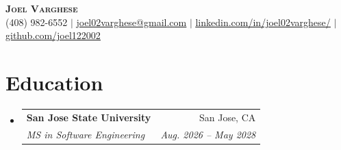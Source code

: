 \documentclass[letterpaper,11pt]{article}
\makeatletter
\newcommand{\resumeSubheading}[4]{
  \vspace{-2pt}\item
    \begin{tabular*}{0.97\textwidth}[t]{l@{\extracolsep{\fill}}r}
      \textbf{#1} & #2 \\
      \textit{\small#3} & \textit{\small #4} \\
    \end{tabular*}\vspace{-7pt}
}
\newcommand{\resumeSubHeadingListStart}{\begin{itemize}[leftmargin=0.15in, label={}]}
\newcommand{\resumeSubHeadingListEnd}{\end{itemize}}
\makeatother
\begin{document}
\begin{center}
  \textbf{\Huge \scshape Joel Varghese} \\ \vspace{1pt}
  \small (408) 982-6552 $|$ \href{mailto:joel02varghese@gmail.com}{\underline{joel02varghese@gmail.com}} $|$
  \href{https://www.linkedin.com/in/joel02varghese/}{\underline{linkedin.com/in/joel02varghese/}} $|$
  \href{https://github.com/joel122002}{\underline{github.com/joel122002}}
\end{center}

\section{Education}
\resumeSubHeadingListStart
\resumeSubheading
{San Jose State University}{San Jose, CA}
{MS in Software Engineering}{Aug. 2026 -- May 2028}
\resumeSubHeadingListEnd
\end{document}
